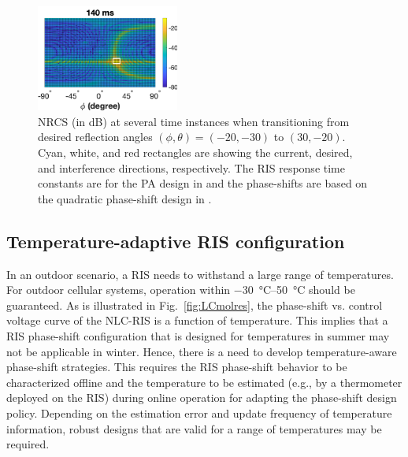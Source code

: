 \begin{figure}[h]
\begin{minipage}[t]{0.205\textwidth}
     \centering
         \includegraphics[width=\textwidth,height=3.5cm]{Figures/5LC_transition_3D.pdf}
   \end{minipage}
    \caption{\gls{NRCS} (in dB) at several time instances when transitioning from desired reflection angles $(\phi,\theta)=(-20,-30)$ to $(30,-20)$. Cyan, white, and red rectangles are showing the current, desired, and interference directions, respectively. The \gls{RIS} response time constants are for the \gls{PA} design in \cite{neuder2023compact} and the phase-shifts are based on the quadratic phase-shift design in \cite{jamali2021power}.}
    \label{fig:time response}
\end{figure}

\subsection{Temperature-adaptive RIS configuration}\label{sec:temperature}
In an outdoor scenario, a \gls{RIS} needs to withstand a large range of temperatures.
For outdoor cellular systems, operation within \SIrange{-30}{+50}{\celsius} should be guaranteed. %
As is illustrated in Fig.~\ref{fig:LCmolres}, the phase-shift vs. control voltage curve of the \gls{NLC}-\gls{RIS} is a function of temperature. This implies that a \gls{RIS} phase-shift configuration that is designed for temperatures in summer may not be applicable in winter. Hence, there is a need to develop temperature-aware phase-shift strategies. This requires the \gls{RIS} phase-shift behavior to be characterized offline and  the temperature to be estimated (e.g., by a thermometer deployed on the \gls{RIS}) during online operation for adapting the phase-shift design policy. Depending on the estimation error and update frequency of temperature information, robust designs that are valid for a range of temperatures may be required.


